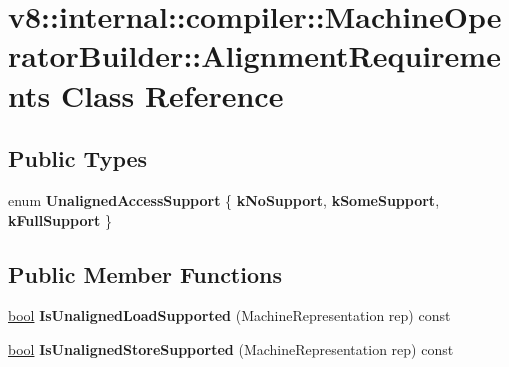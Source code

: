 \hypertarget{classv8_1_1internal_1_1compiler_1_1MachineOperatorBuilder_1_1AlignmentRequirements}{}\section{v8\+:\+:internal\+:\+:compiler\+:\+:Machine\+Operator\+Builder\+:\+:Alignment\+Requirements Class Reference}
\label{classv8_1_1internal_1_1compiler_1_1MachineOperatorBuilder_1_1AlignmentRequirements}
\subsection*{Public Types}
\begin{DoxyCompactItemize}
\item 
\mbox{\label{classv8_1_1internal_1_1compiler_1_1MachineOperatorBuilder_1_1AlignmentRequirements_a8042b63517b4c0ff2d17c6a9b9cd2a6b}} 
enum {\bfseries Unaligned\+Access\+Support} \{ {\bfseries k\+No\+Support}, 
{\bfseries k\+Some\+Support}, 
{\bfseries k\+Full\+Support}
 \}
\end{DoxyCompactItemize}
\subsection*{Public Member Functions}
\begin{DoxyCompactItemize}
\item 
\mbox{\label{classv8_1_1internal_1_1compiler_1_1MachineOperatorBuilder_1_1AlignmentRequirements_a11ffab020dd6d0fda135714664263e77}} 
\mbox{\hyperlink{classbool}{bool}} {\bfseries Is\+Unaligned\+Load\+Supported} (Machine\+Representation rep) const
\item 
\mbox{\label{classv8_1_1internal_1_1compiler_1_1MachineOperatorBuilder_1_1AlignmentRequirements_ac9fa29c249f0be05f5de60e2a9c99f29}} 
\mbox{\hyperlink{classbool}{bool}} {\bfseries Is\+Unaligned\+Store\+Supported} (Machine\+Representation rep) const
\end{DoxyCompactItemize}
